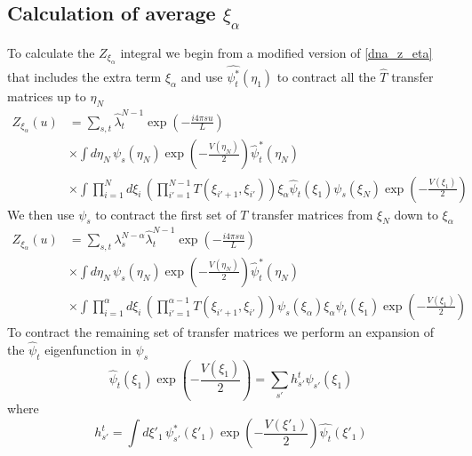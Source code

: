 \subsection{Calculation of average $\xi_{\alpha}$}

To calculate the $Z_{\xi_{\alpha}}$ integral we begin from a modified version of \eqref{dna_z_eta} that includes the extra term $\xi_{\alpha}$ and use $\hat{\psi_{t}^{*}}\left(\eta_{1}\right)$ to contract all the $\hat{T}$ transfer matrices up to $\eta_{N}$
%
\begin{align}
Z_{\xi_{\alpha}}\left(u\right)&=\sum_{s,t}\hat{\lambda}_{t}^{N-1}\exp\left(-\frac{i4\pi s u}{L}\right)\\
&\times\int d\eta_{N}\,\psi_{s}\left(\eta_{N}\right)\exp\left(-\frac{V\left(\eta_{N}\right)}{2}\right)\hat{\psi}^{*}_{t}\left(\eta_{N}\right)\nonumber\\
&\times\int \prod_{i=1}^{N}d\xi_{i}\,\left(\prod_{i'=1}^{N-1}T\left(\xi_{i'+1},\xi_{i'}\right)\right)\xi_{\alpha}\hat{\psi}_{t}\left(\xi_{1}\right)\psi_{s}\left(\xi_{N}\right)\exp\left(-\frac{V\left(\xi_{1}\right)}{2}\right)\nonumber
\end{align}
%
We then use $\psi_{s}$ to contract the first set of $T$ transfer matrices from $\xi_{N}$ down to $\xi_{\alpha}$
%
\begin{align}
Z_{\xi_{\alpha}}\left(u\right)&=\sum_{s,t}\lambda_{s}^{N-\alpha}\hat{\lambda}_{t}^{N-1}\exp\left(-\frac{i4\pi s u}{L}\right)\\
&\times\int d\eta_{N}\,\psi_{s}\left(\eta_{N}\right)\exp\left(-\frac{V\left(\eta_{N}\right)}{2}\right)\hat{\psi}^{*}_{t}\left(\eta_{N}\right)\nonumber\\
&\times\int \prod_{i=1}^{\alpha}d\xi_{i}\,\left(\prod_{i'=1}^{\alpha-1}T\left(\xi_{i'+1},\xi_{i'}\right)\right)\psi_{s}\left(\xi_{\alpha}\right)\xi_{\alpha}\hat{\psi}_{t}\left(\xi_{1}\right)\exp\left(-\frac{V\left(\xi_{1}\right)}{2}\right)\nonumber
\end{align}
%
To contract the remaining set of transfer matrices we perform an expansion of the $\hat{\psi}_t$ eigenfunction in $\psi_{s}$
%
\begin{equation}
\hat{\psi}_{t}\left(\xi_{1}\right)\exp\left(-\frac{V\left(\xi_{1}\right)}{2}\right) = \sum_{s'}h^{t}_{s'}\psi_{s'}\left(\xi_{1}\right)
\end{equation}
%
where
%
\begin{equation}
\label{dna_h_matrix}
h^{t}_{s'}=\int d\xi'_{1}\,\psi^{*}_{s'}\left(\xi'_{1}\right)\exp\left(-\frac{V\left(\xi'_{1}\right)}{2}\right)\hat{\psi_{t}}\left(\xi'_{1}\right)
\end{equation}
